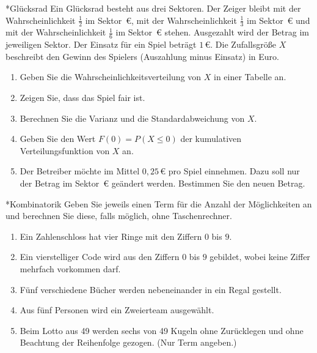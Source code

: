 
\begin{uebung}*{Glücksrad}
Ein Glücksrad besteht aus drei Sektoren. Der Zeiger bleibt mit der Wahrscheinlichkeit $\frac{1}{2}$ im Sektor \,€\grqq, mit der Wahrscheinlichkeit $\frac{1}{3}$ im Sektor \,€\grqq{} und mit der Wahrscheinlichkeit $\frac{1}{6}$ im Sektor \,€\grqq{} stehen. Ausgezahlt wird der Betrag im jeweiligen Sektor. Der Einsatz für ein Spiel beträgt $1$\,€. Die Zufallsgröße $X$ beschreibt den Gewinn des Spielers (Auszahlung minus Einsatz) in Euro.
\begin{enumerate}[label=\alph*)]
  \item Geben Sie die Wahrscheinlichkeitsverteilung von $X$ in einer Tabelle an.
  \item Zeigen Sie, dass das Spiel fair ist.
  \item Berechnen Sie die Varianz und die Standardabweichung von $X$.
  \item Geben Sie den Wert $F(0) = P(X\leq 0)$ der kumulativen Verteilungsfunktion von $X$ an.
  \item Der Betreiber möchte im Mittel $0{,}25$\,€ pro Spiel einnehmen. Dazu soll nur der Betrag im Sektor \,€\grqq{} geändert werden. Bestimmen Sie den neuen Betrag.
\end{enumerate}
\end{uebung}


\begin{uebung}*{Kombinatorik}
Geben Sie jeweils einen Term für die Anzahl der Möglichkeiten an und berechnen Sie diese, falls möglich, ohne Taschenrechner.
\begin{enumerate}[label=\alph*)]
  \item Ein Zahlenschloss hat vier Ringe mit den Ziffern $0$ bis $9$.
  \item Ein vierstelliger Code wird aus den Ziffern $0$ bis $9$ gebildet, wobei keine Ziffer mehrfach vorkommen darf.
  \item Fünf verschiedene Bücher werden nebeneinander in ein Regal gestellt.
  \item Aus fünf Personen wird ein Zweierteam ausgewählt.
  \item Beim Lotto  aus 49\grqq{} werden sechs von 49 Kugeln ohne Zurücklegen und ohne Beachtung der Reihenfolge gezogen. (Nur Term angeben.)
\end{enumerate}
\end{uebung}

